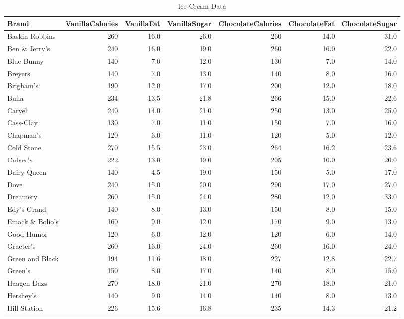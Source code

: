 \documentclass[
  12pt,
]{report}
\begin{document}
\begin{table}[!h]

\caption{\label{tab:unnamed-chunk-27}Ice Cream Data}
\centering
\begin{tabular}[t]{l|r|r|r|r|r|r}
\hline
Brand & VanillaCalories & VanillaFat & VanillaSugar & ChocolateCalories & ChocolateFat & ChocolateSugar\\
\hline
Baskin Robbins & 260 & 16.0 & 26.0 & 260 & 14.0 & 31.0\\
\hline
Ben \& Jerry's & 240 & 16.0 & 19.0 & 260 & 16.0 & 22.0\\
\hline
Blue Bunny & 140 & 7.0 & 12.0 & 130 & 7.0 & 14.0\\
\hline
Breyers & 140 & 7.0 & 13.0 & 140 & 8.0 & 16.0\\
\hline
Brigham's & 190 & 12.0 & 17.0 & 200 & 12.0 & 18.0\\
\hline
Bulla & 234 & 13.5 & 21.8 & 266 & 15.0 & 22.6\\
\hline
Carvel & 240 & 14.0 & 21.0 & 250 & 13.0 & 25.0\\
\hline
Cass-Clay & 130 & 7.0 & 11.0 & 150 & 7.0 & 16.0\\
\hline
Chapman's & 120 & 6.0 & 11.0 & 120 & 5.0 & 12.0\\
\hline
Cold Stone & 270 & 15.5 & 23.0 & 264 & 16.2 & 23.6\\
\hline
Culver's & 222 & 13.0 & 19.0 & 205 & 10.0 & 20.0\\
\hline
Dairy Queen & 140 & 4.5 & 19.0 & 150 & 5.0 & 17.0\\
\hline
Dove & 240 & 15.0 & 20.0 & 290 & 17.0 & 27.0\\
\hline
Dreamery & 260 & 15.0 & 24.0 & 280 & 12.0 & 33.0\\
\hline
Edy's Grand & 140 & 8.0 & 13.0 & 150 & 8.0 & 15.0\\
\hline
Emack \& Bolio's & 160 & 9.0 & 12.0 & 170 & 9.0 & 13.0\\
\hline
Good Humor & 120 & 6.0 & 12.0 & 120 & 6.0 & 14.0\\
\hline
Graeter's & 260 & 16.0 & 24.0 & 260 & 16.0 & 24.0\\
\hline
Green and Black & 194 & 11.6 & 18.0 & 227 & 12.8 & 22.7\\
\hline
Green's & 150 & 8.0 & 17.0 & 140 & 8.0 & 15.0\\
\hline
Haagen Dazs & 270 & 18.0 & 21.0 & 270 & 18.0 & 21.0\\
\hline
Hershey's & 140 & 9.0 & 14.0 & 140 & 8.0 & 13.0\\
\hline
Hill Station & 226 & 15.6 & 16.8 & 235 & 14.3 & 21.2\\

\end{tabular}
\end{table}
\end{document}
